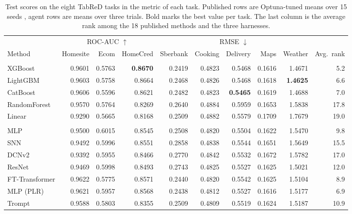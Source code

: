\begin{table}[t]
\centering
\caption{Test scores on the eight TabReD tasks in the metric of each task. Published rows are Optuna-tuned means over 15 seeds \citep{rubachev2024tabred}, agent rows are means over three trials. Bold marks the best value per task. The last column is the average rank among the 18 published methods and the three harnesses.}
\label{tab:leaderboard}
\small
\setlength{\tabcolsep}{3pt}
\begin{tabular}{lrrrrrrrrr}
\toprule
& \multicolumn{3}{c}{ROC-AUC $\uparrow$} & \multicolumn{5}{c}{RMSE $\downarrow$} & \\
\cmidrule(lr){2-4}\cmidrule(lr){5-9}
Method & Homesite & Ecom & HomeCred & Sberbank & Cooking & Delivery & Maps & Weather & Avg.\ rank \\
\midrule
\addlinespace[2pt]
\multicolumn{10}{l}{\itshape GBDT} \\
XGBoost & 0.9601 & 0.5763 & \textbf{0.8670} & 0.2419 & 0.4823 & 0.5468 & 0.1616 & 1.4671 & 5.2 \\
LightGBM & 0.9603 & 0.5758 & 0.8664 & 0.2468 & 0.4826 & 0.5468 & 0.1618 & \textbf{1.4625} & 6.6 \\
CatBoost & 0.9606 & 0.5596 & 0.8621 & 0.2482 & 0.4823 & \textbf{0.5465} & 0.1619 & 1.4688 & 7.0 \\
RandomForest & 0.9570 & 0.5764 & 0.8269 & 0.2640 & 0.4884 & 0.5959 & 0.1653 & 1.5838 & 17.8 \\
Linear & 0.9290 & 0.5665 & 0.8168 & 0.2509 & 0.4882 & 0.5579 & 0.1709 & 1.7679 & 19.0 \\
\addlinespace[2pt]
\multicolumn{10}{l}{\itshape Tabular DL} \\
MLP & 0.9500 & 0.6015 & 0.8545 & 0.2508 & 0.4820 & 0.5504 & 0.1622 & 1.5470 & 9.8 \\
SNN & 0.9492 & 0.5996 & 0.8551 & 0.2858 & 0.4838 & 0.5544 & 0.1651 & 1.5649 & 15.5 \\
DCNv2 & 0.9392 & 0.5955 & 0.8466 & 0.2770 & 0.4842 & 0.5532 & 0.1672 & 1.5782 & 17.0 \\
ResNet & 0.9469 & 0.5998 & 0.8493 & 0.2743 & 0.4825 & 0.5527 & 0.1625 & 1.5021 & 12.0 \\
FT-Transformer & 0.9622 & 0.5775 & 0.8571 & 0.2440 & 0.4820 & 0.5542 & 0.1625 & 1.5104 & 8.9 \\
MLP (PLR) & 0.9621 & 0.5957 & 0.8568 & 0.2438 & 0.4812 & 0.5527 & 0.1616 & 1.5177 & 6.9 \\
Trompt & 0.9588 & 0.5803 & 0.8355 & 0.2509 & 0.4809 & 0.5519 & 0.1624 & 1.5187 & 10.9 \\

\end{tabular}
\end{table}
